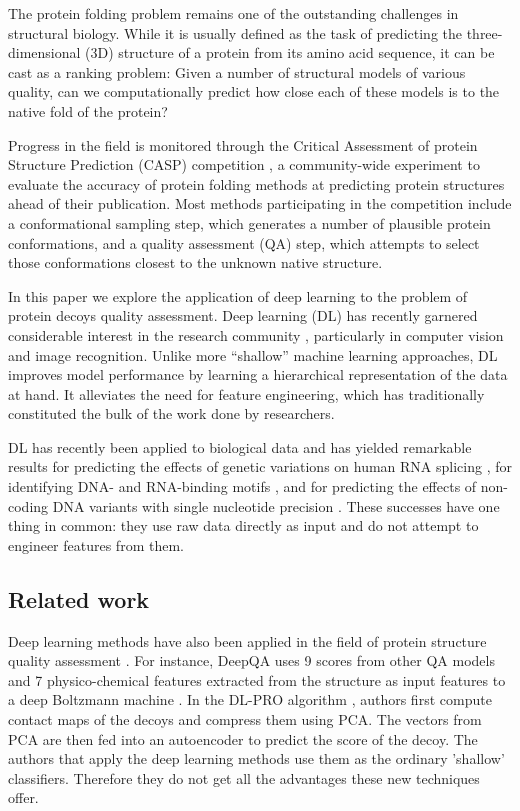 

The protein folding problem \cite{dill2012folding} remains one of the
outstanding challenges in structural biology. While it is usually
defined as the task of predicting the three-dimensional (3D) structure
of a protein from its amino acid sequence, it can be cast as a ranking
problem: Given a number of structural models of various quality, can
we computationally predict how close each of these models is to the
native fold of the protein?

Progress in the field is monitored through the Critical Assessment of
protein Structure Prediction (CASP) competition \cite{moult1995large},
a community-wide experiment to evaluate the accuracy of protein
folding methods at predicting protein structures ahead of their
publication. Most methods participating in the competition include a
conformational sampling step, which generates a number of plausible
protein conformations, and a quality assessment (QA) step, which
attempts to select those conformations closest to the unknown native
structure.

In this paper we explore the application of deep learning to the
problem of protein decoys quality assessment. Deep learning (DL) has
recently garnered considerable interest in the research
community \cite{lecun2015deep}, particularly in computer vision and
image recognition. Unlike more ``shallow'' machine learning
approaches, DL improves model performance by learning a hierarchical
representation of the data at hand. It alleviates the need for feature
engineering, which has traditionally constituted the bulk of the work
done by researchers.

DL has recently been applied to biological data and has yielded
remarkable results for predicting the effects of genetic variations on
human RNA splicing \cite{xiong2015human}, for identifying DNA- and
RNA-binding motifs \cite{alipanahi2015predicting}, and for predicting
the effects of non-coding DNA variants with single nucleotide
precision \cite{zhou2015predicting}. These successes have one thing in
common: they use raw data directly as input and do not attempt to
engineer features from them.

\subsection{Related work}
Deep learning methods have also been applied in the field of protein
structure quality assessment \cite{nguyen2014dlpro, cao2016deepqa,
uziela2017proq3d}. For instance, DeepQA \cite{cao2016deepqa} uses 9
scores from other QA models and 7 physico-chemical features extracted
from the structure as input features to a deep Boltzmann
machine \cite{}. In the DL-PRO algorithm \cite{nguyen2014dlpro},
authors first compute contact maps of the decoys and compress them
using PCA. The vectors from PCA are then fed into an autoencoder to
predict the score of the decoy. The authors that apply the deep
learning methods use them as the ordinary 'shallow' classifiers.
Therefore they do not get all the advantages these new techniques
offer.

